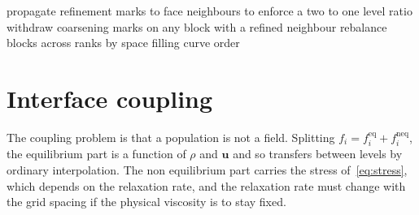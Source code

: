 \begin{algorithm}[t]
\SetAlgoLined
{}
propagate refinement marks to face neighbours to enforce a two to one level
ratio\;
withdraw coarsening marks on any block with a refined neighbour\;
rebalance blocks across ranks by space filling curve order\;
\caption{Regridding pass, executed every $n_r = 200$ coarse steps.}
\label{alg:regrid}
\end{algorithm}

\section{Interface coupling}
\label{sec:method-coupling}

The coupling problem is that a population is not a field. Splitting
$f_i = f_i^{\mathrm{eq}} + f_i^{\mathrm{neq}}$, the equilibrium part is a
function of $\rho$ and $\mathbf{u}$ and so transfers between levels by ordinary
interpolation. The non equilibrium part carries the stress
of~\eqref{eq:stress}, which depends on the relaxation rate, and the relaxation
rate must change with the grid spacing if the physical viscosity is to stay
fixed.

